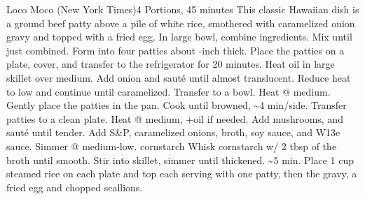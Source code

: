 \documentclass[a6paper,landscape]{article}
\begin{document}
\begin{recipe}{Loco Moco (New York Times)}{4 Portions, 45 minutes}{}
  \freeform This classic Hawaiian dish is a ground beef patty above a pile of white rice, smothered with caramelized onion gravy and topped with a fried egg.
  In large bowl, combine ingredients. Mix until just combined. Form into four patties about -inch thick. Place the patties on a plate, cover, and transfer to the refrigerator for 20 minutes.
  Heat oil in large skillet over medium. Add onion and sauté until almost translucent. Reduce heat to low and continue until caramelized. Transfer to a bowl. 
  Heat @ medium. Gently place the patties in the pan. Cook until browned, \textasciitilde4 min/side. Transfer patties to a clean plate.
  Heat @ medium, +oil if needed. Add mushrooms, and sauté until tender. Add S\&P, caramelized onions, broth, soy sauce, and W13e sauce. Simmer @ medium-low.
   {cornstarch}
  Whisk cornstarch w/ 2 tbsp of the broth until smooth. Stir into skillet, simmer until thickened. \textasciitilde5 min.
  Place 1 cup steamed rice on each plate and top each serving with one patty, then the gravy, a fried egg and chopped scallions.

  \end{recipe}
\end{document}
